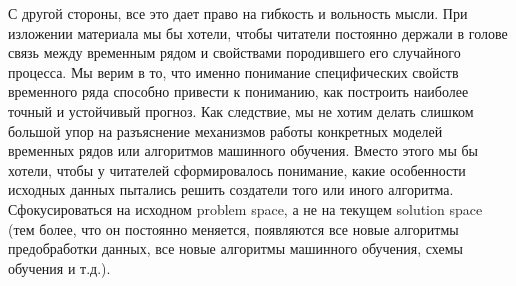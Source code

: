С другой стороны, все это дает право на гибкость и вольность мысли.
При изложении материала мы бы хотели, чтобы читатели постоянно
держали в голове связь между временным рядом и свойствами
породившего его случайного процесса.
Мы верим в то, что именно понимание специфических
свойств временного ряда способно привести к пониманию, как
построить наиболее точный и устойчивый прогноз. Как следствие, мы
не хотим делать слишком большой упор на разъяснение механизмов
работы конкретных моделей временных рядов или алгоритмов машинного
обучения. Вместо этого мы бы хотели, чтобы у читателей
сформировалось понимание, какие особенности исходных данных
пытались решить создатели того или иного алгоритма. Сфокусироваться
на исходном problem space, а не на текущем solution space
(тем более, что он постоянно меняется, появляются все новые алгоритмы
  предобработки данных, все новые алгоритмы машинного обучения, схемы
обучения и т.д.).

\printbibliography[heading=subbibliography, title={Источники}]
